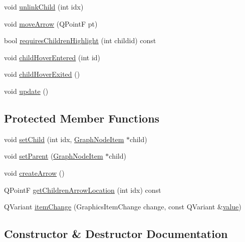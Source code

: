 \begin{DoxyCompactItemize}
void \mbox{\hyperlink{class_graph_node_item_ac5b960d911669556e574385df1ffd983}{unlink\+Child}} (int idx)
\item 
void \mbox{\hyperlink{class_graph_node_item_a966bc6347e401c96dd35131ff5faca07}{move\+Arrow}} (Q\+PointF pt)
\item 
bool \mbox{\hyperlink{class_graph_node_item_a185f228f66154b43d54872af63add657}{requires\+Children\+Highlight}} (int childid) const
\item 
void \mbox{\hyperlink{class_graph_node_item_a7651a73e3c791d945a0f96b4115ae8a5}{child\+Hover\+Entered}} (int id)
\item 
void \mbox{\hyperlink{class_graph_node_item_a8a706cb476880abfb2125120dc000d23}{child\+Hover\+Exited}} ()
\item 
void \mbox{\hyperlink{class_graph_node_item_ac0ead52a3a186501534ccfb1e07453b9}{update}} ()
\end{DoxyCompactItemize}
\subsection*{Protected Member Functions}
\begin{DoxyCompactItemize}
\item 
void \mbox{\hyperlink{class_graph_node_item_af4a71474e84768b8f97a1a923c718227}{set\+Child}} (int idx, \mbox{\hyperlink{class_graph_node_item}{Graph\+Node\+Item}} $\ast$child)
\item 
void \mbox{\hyperlink{class_graph_node_item_a55f25d4ef12bed7a753e2cf6f61a120d}{set\+Parent}} (\mbox{\hyperlink{class_graph_node_item}{Graph\+Node\+Item}} $\ast$child)
\item 
void \mbox{\hyperlink{class_graph_node_item_a4f88151bd566c0678c76c66b5896676f}{create\+Arrow}} ()
\item 
Q\+PointF \mbox{\hyperlink{class_graph_node_item_a9fe01f4d95d8e21f96230ca297d0afef}{get\+Children\+Arrow\+Location}} (int idx) const
\item 
Q\+Variant \mbox{\hyperlink{class_graph_node_item_aeaf41566cb0c18e001622f48ffd6ce70}{item\+Change}} (Graphics\+Item\+Change change, const Q\+Variant \&\mbox{\hyperlink{diffusion_8cpp_a4b41795815d9f3d03abfc739e666d5da}{value}})
\end{DoxyCompactItemize}


\subsection{Constructor \& Destructor Documentation}
\mbox{\label{class_graph_node_item_a42bb99a91d988fa1e2e45f051278d4ee}} 
